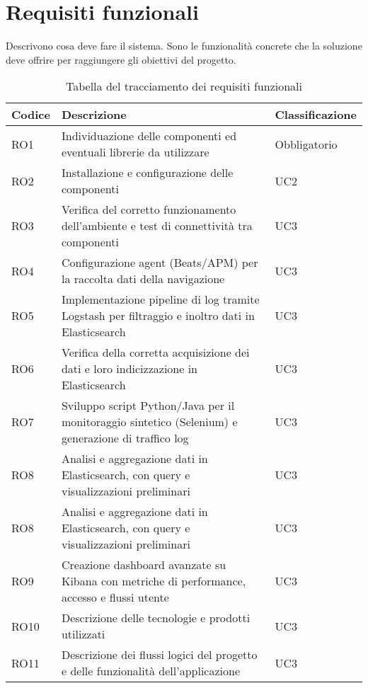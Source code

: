 \newpage
\section{Requisiti funzionali}
Descrivono cosa deve fare il sistema.
Sono le funzionalità concrete che la soluzione deve offrire per raggiungere gli obiettivi del progetto.

\begin{table}[h]
\caption{Tabella del tracciamento dei requisiti funzionali}
\label{tab:requisiti-funzionali}
\begin{tabularx}{\textwidth}{lXl}
\hline\hline
\textbf{Codice} & \textbf{Descrizione} & \textbf{Classificazione}\\
\hline
RO1     & Individuazione delle componenti ed eventuali librerie da utilizzare & Obbligatorio \\
\hline

\hline
RO2     & Installazione e configurazione delle componenti & UC2 \\
\hline

\hline
RO3     & Verifica del corretto funzionamento dell'ambiente e test di connettività tra componenti & UC3 \\
\hline

\hline
RO4     & Configurazione agent (Beats/APM) per la raccolta dati della navigazione & UC3 \\
\hline

\hline
RO5     & Implementazione pipeline di log tramite Logstash per filtraggio e inoltro dati in Elasticsearch & UC3 \\
\hline

\hline
RO6     & Verifica della corretta acquisizione dei dati e loro indicizzazione in Elasticsearch & UC3 \\
\hline

\hline
RO7     & Sviluppo script Python/Java per il monitoraggio sintetico (Selenium) e generazione di traffico log & UC3 \\
\hline

\hline
RO8     & Analisi e aggregazione dati in Elasticsearch, con query e visualizzazioni preliminari & UC3 \\
\hline

\hline
RO8     & Analisi e aggregazione dati in Elasticsearch, con query e visualizzazioni preliminari & UC3 \\
\hline

\hline
RO9     & Creazione dashboard avanzate su Kibana con metriche di performance, accesso e flussi utente & UC3 \\
\hline

\hline
RO10     & Descrizione delle tecnologie e prodotti utilizzati & UC3 \\
\hline

\hline
RO11     & Descrizione dei flussi logici del progetto e delle funzionalità dell'applicazione & UC3 \\
\hline
\end{tabularx}
\end{table}%

